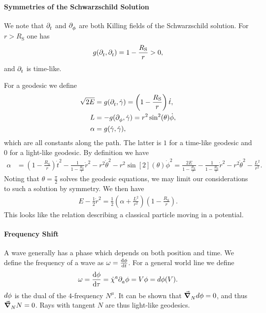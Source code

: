 \paragraph{Symmetries of the Schwarzschild Solution}
We note that $\partial^{}_{t}$ and $\partial^{}_{\phi}$ are both Killing fields of the Schwarzschild solution. For $r > R_{\text{S}}$ one has
\begin{align*}
	g(\partial^{}_{t}, \partial^{}_{t}) = 1 - \frac{R_{\text{S}}}{r} > 0,
\end{align*}
and $\partial^{}_{t}$ is time-like.

For a geodesic we define
\begin{align*}
	\sqrt{2E} &= g(\partial^{}_{t}, \dot{\gamma}) = \left(1 - \frac{R_{\text{S}}}{r}\right)\dot{t}, \\
	L         &= -g(\partial^{}_{\phi}, \dot{\gamma}) = r^{2}\sin[2](\theta)\dot{\phi}, \\
	\alpha    &= g(\dot{\gamma}, \dot{\gamma}),
\end{align*}
which are all constants along the path. The latter is $1$ for a time-like geodesic and $0$ for a light-like geodesic. By definition we have
\begin{align*}
	\alpha &= \left(1 - \frac{R_{\text{S}}}{r}\right)\dot{t}^{2} - \frac{1}{1 - \frac{R_{\text{S}}}{r}}\dot{r}^{2} - r^{2}\dot{\theta}^{2}  - r^{2}\sin[2](\theta)\dot{\phi}^{2} = \frac{2E}{1 - \frac{R_{\text{S}}}{r}} - \frac{1}{1 - \frac{R_{\text{S}}}{r}}\dot{r}^{2} - r^{2}\dot{\theta}^{2} - \frac{L^{2}}{r^{2}}.
\end{align*}
Noting that $\theta = \frac{\pi}{2}$ solves the geodesic equations, we may limit our considerations to such a solution by symmetry. We then have
\begin{align*}
	E - \frac{1}{2}\dot{r}^{2} = \frac{1}{2}\left(\alpha + \frac{L^{2}}{r^{2}}\right)\left(1 - \frac{R_{\text{S}}}{r}\right).
\end{align*}
This looks like the relation describing a classical particle moving in a potential.

\paragraph{Frequency Shift}
A wave generally has a phase which depends on both position and time. We define the frequency of a wave as $\omega = \dv{\phi}{t}$. For a general world line we define
\begin{align*}
	\omega = \dv{\phi}{\tau} = \dot{\chi}^{a}\partial^{}_{a}\phi = V\phi = d\phi(V).
\end{align*}
$d\phi$ is the dual of the $4$-frequency $N^{\mu}$. It can be shown that $\grad_{N}^{}{d\phi} = 0$, and thus $\grad_{N}^{}{N} = 0$. Rays with tangent $N$ are thus light-like geodesics.


